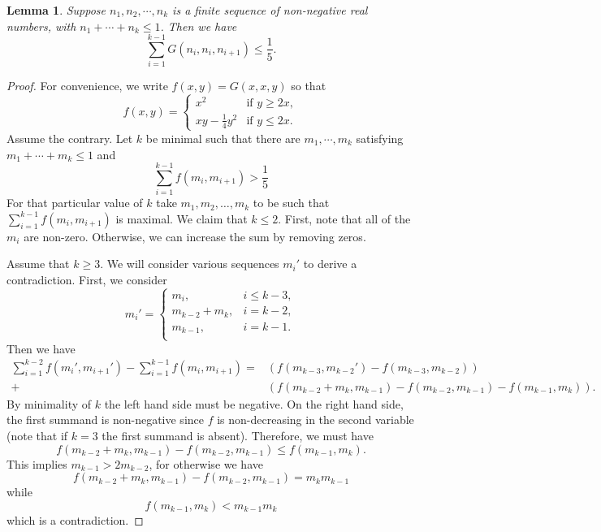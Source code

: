 \documentclass[12pt, notitlepage]{amsart}
\numberwithin{equation}{section}
\newtheorem{lemma}[theorem]{Lemma}
\theoremstyle{remark}
\theoremstyle{definition}
\theoremstyle{remark}
\numberwithin{equation}{section}
\begin{document}
\begin{lemma}
    \label{lem:optimize}
    Suppose $n_1, n_2, \cdots, n_k$ is a finite sequence of non-negative real numbers, with $ n_1 + \cdots + n_k \leq 1$. Then we have
    $$\sum_{i = 1}^{k - 1} G(n_i, n_i,n_{i + 1}) \leq \frac{1}{5}.$$
\end{lemma}
\begin{proof}
For convenience, we write $f(x,y) = G(x,x,y)$ so that
$$
f(x,y) = \begin{cases} x^2 & \text{if }y \geq 2x, \\ xy-\frac{1}{4}y^2 & \text{if }y \leq 2x.\end{cases}
$$
Assume the contrary. Let $k$ be minimal such that there are $m_1, \cdots, m_k$ satisfying $m_1+\cdots+m_k \leq 1$ and
\[\sum_{i=1}^{k-1}f(m_i,m_{i+1})>\frac{1}{5}
\] For that particular value of $k$ take $m_1,m_2,\ldots ,m_k$ to be such that $\sum_{i=1}^{k-1}f(m_i,m_{i+1})$ is maximal. We claim that $k\le 2$. First, note that all of the $m_i$ are non-zero. Otherwise, we can increase the sum by removing zeros.

Assume that $k\ge 3$. We will consider various sequences $m_i'$ to derive a contradiction. First, we consider 
$$m_i' = \begin{cases}
m_i, &i \leq k - 3, \\
m_{k - 2} + m_k, &i = k - 2, \\ 
m_{k - 1}, & i = k - 1. \\
\end{cases}$$
Then we have
\begin{align*}
\sum_{i = 1}^{k - 2} f(m_i', m_{i + 1}') - \sum_{i = 1}^{k - 1} f(m_i, m_{i + 1}) 
=& (f(m_{k - 3}, m_{k - 2}') - f(m_{k - 3}, m_{k - 2})) \\
+& (f(m_{k - 2} + m_k, m_{k - 1}) - f(m_{k - 2}, m_{k - 1}) - f(m_{k - 1}, m_{k}))    .
\end{align*}
By minimality of $k$ the left hand side must be negative. On the right hand side, the first summand is non-negative since $f$ is non-decreasing in the second variable (note that if $k=3$ the first summand is absent). Therefore, we must have
$$f(m_{k - 2} + m_k, m_{k - 1}) - f(m_{k - 2}, m_{k - 1}) \leq f(m_{k - 1}, m_{k}).$$
This implies $m_{k - 1} > 2 m_{k - 2}$, for otherwise we have
$$f(m_{k - 2} + m_k, m_{k - 1}) - f(m_{k - 2}, m_{k - 1}) = m_k m_{k - 1}$$
while
$$f(m_{k - 1}, m_{k}) < m_{k - 1} m_{k}$$
which is a contradiction.


\end{proof}
\end{document}
